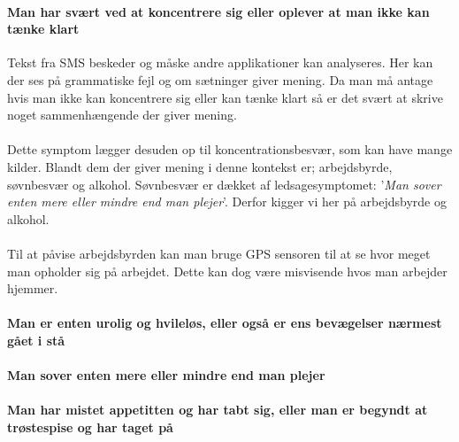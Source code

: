 \paragraph{Man har svært ved at koncentrere sig eller oplever at man ikke kan tænke klart}
Tekst fra SMS beskeder og måske andre applikationer kan analyseres. Her kan der ses på grammatiske fejl og om sætninger giver mening. Da man må antage hvis man ikke kan koncentrere sig eller kan tænke klart så er det svært at skrive noget sammenhængende der giver mening.
\\
\\
Dette symptom lægger desuden op til koncentrationsbesvær, som kan have mange kilder. Blandt dem der giver mening i denne kontekst er; arbejdsbyrde, søvnbesvær og alkohol.\cite{koncentration}
Søvnbesvær er dækket af ledsagesymptomet: '\textit{Man sover enten mere eller mindre end man plejer}'. Derfor kigger vi her på arbejdsbyrde og alkohol.
\\
\\
Til at påvise arbejdsbyrden kan man bruge GPS sensoren til at se hvor meget man opholder sig på arbejdet. Dette kan dog være misvisende hvos man arbejder hjemmer.

\paragraph{Man er enten urolig og hvileløs, eller også er ens bevægelser nærmest gået i stå}
\paragraph{Man sover enten mere eller mindre end man plejer}
\paragraph{Man har mistet appetitten og har tabt sig, eller man er begyndt at trøstespise og har taget på}